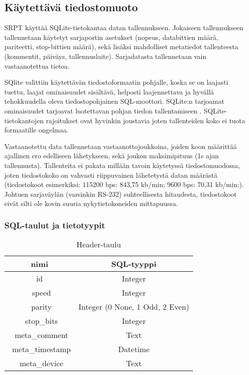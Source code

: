 \subsection{Käytettävä tiedostomuoto}
SRPT käyttää SQLite-tietokantaa datan tallennukseen. Jokaiseen tallennukseen tallennetaan käytetyt sarjaportin asetukset (nopeus, databittien määrä, pariteetti, stop-bittien määrä), sekä lisäksi mahdolliset metatiedot tallenteesta (kommentit, päiväys, tallennuslaite). Sarjadatasta tallennetaan vain vastaanotettua tietoa.

SQlite valittiin käytettävän tiedostoformaatin pohjalle, koska se on laajasti tuettu, laajat ominaisuudet sisältävä, helposti laajennettava ja hyvällä tehokkuudella oleva tiedostopohjainen SQL-moottori. SQLite:n tarjoamat ominaisuudet tarjoavat luotettavan pohjan tiedon tallentamiseen \cite{sqlite:appfileformat}. SQLite-tietokantojen rajoitukset ovat hyvinkin joustavia joten tallenteiden koko ei tuota formaatille ongelmaa.

Vastaanotettu data tallennetaan vastaanottojoukkoina, joiden koon määrittää ajallinen ero edelliseen lähetykseen, sekä joukon maksimipituus (1s ajan tallennusta). Tallenteita ei pakata millään tavoin käytetyssä tiedostomuodossa, joten tiedostokoko on vahvasti riippuvainen lähetetystä datan määrästä (tiedostokoot esimerkiksi: 115200 bps: 843,75 kb/min; 9600 bps: 70,31 kb/min;). Johtuen sarjaväylän (varsinkin RS-232) suhteellisesta hitaudesta, tiedostokoot eivät silti ole kovin suuria nykytietokoneiden mittapuussa.


\subsubsection{SQL-taulut ja tietotyypit}

\begin{table}[h]
\centering
\caption{Header-taulu}
\begin{tabular}{ c|c }
\centering
nimi & SQL-tyyppi \\\toprule
id & Integer \\\
speed & Integer \\\
parity & Integer (0 None, 1 Odd, 2 Even) \\\
stop\_bits & Integer \\\
meta\_comment & Text \\\
meta\_timestamp & Datetime \\\
meta\_device & Text \\\bottomrule
\end{tabular}
\end{table}

